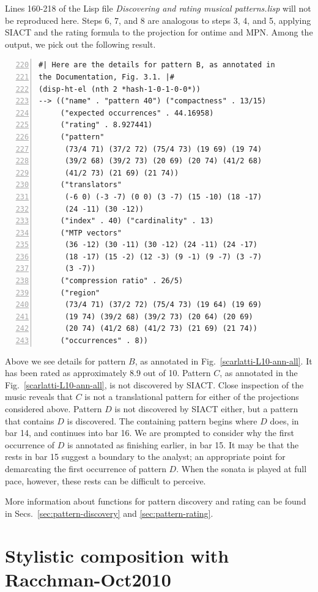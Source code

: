 Lines 160-218 of the Lisp file \emph{Discovering and rating musical patterns.lisp} will not be reproduced here. Steps 6, 7, and 8 are analogous to steps 3, 4, and 5, applying SIACT and the rating formula to the projection for ontime and MPN. Among the output, we pick out the following result.
\begin{Verbatim}[frame=single,numbers=left,firstnumber=220]
#| Here are the details for pattern B, as annotated in
the Documentation, Fig. 3.1. |#
(disp-ht-el (nth 2 *hash-1-0-1-0-0*))
--> (("name" . "pattern 40") ("compactness" . 13/15)
     ("expected occurrences" . 44.16958)
     ("rating" . 8.927441)
     ("pattern"
      (73/4 71) (37/2 72) (75/4 73) (19 69) (19 74)
      (39/2 68) (39/2 73) (20 69) (20 74) (41/2 68)
      (41/2 73) (21 69) (21 74))
     ("translators"
      (-6 0) (-3 -7) (0 0) (3 -7) (15 -10) (18 -17)
      (24 -11) (30 -12))
     ("index" . 40) ("cardinality" . 13)
     ("MTP vectors"
      (36 -12) (30 -11) (30 -12) (24 -11) (24 -17)
      (18 -17) (15 -2) (12 -3) (9 -1) (9 -7) (3 -7)
      (3 -7))
     ("compression ratio" . 26/5)
     ("region"
      (73/4 71) (37/2 72) (75/4 73) (19 64) (19 69)
      (19 74) (39/2 68) (39/2 73) (20 64) (20 69)
      (20 74) (41/2 68) (41/2 73) (21 69) (21 74))
     ("occurrences" . 8))
\end{Verbatim}
Above we see details for pattern $B$, as annotated in Fig.~\ref{scarlatti-L10-ann-all}. It has been rated as approximately 8.9 out of 10. Pattern $C$, as annotated in the Fig.~\ref{scarlatti-L10-ann-all}, is not discovered by SIACT. Close inspection of the music reveals that $C$ is not a translational pattern for either of the projections considered above. Pattern $D$ is not discovered by SIACT either, but a pattern that contains $D$ is discovered. The containing pattern begins where $D$ does, in bar 14, and continues into bar 16. We are prompted to consider why the first occurrence of $D$ is annotated as finishing earlier, in bar 15. It may be that the rests in bar 15 suggest a boundary to the analyst; an appropriate point for demarcating the first occurrence of pattern $D$. When the sonata is played at full pace, however, these rests can be difficult to perceive.

More information about functions for pattern discovery and rating can be found in Secs.~\ref{sec:pattern-discovery} and \ref{sec:pattern-rating}.


\section[Stylistic composition with Racchman-Oct2010]{Stylistic composition with\\ Racchman-Oct2010}\label{sec:ex:Racchman-Oct2010}

